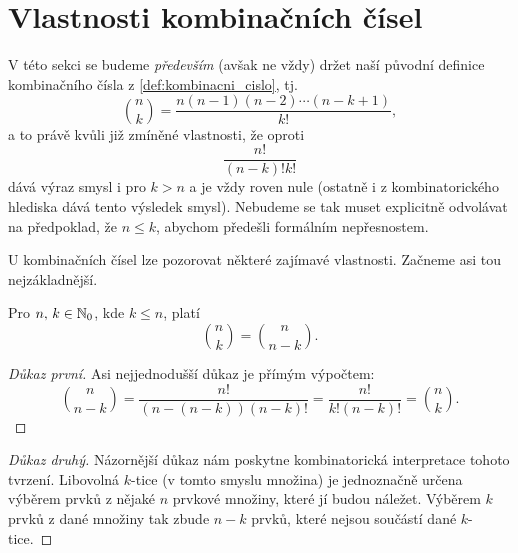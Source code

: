 \section{Vlastnosti kombinačních čísel}

V této sekci se budeme \emph{především} (avšak ne vždy) držet naší původní definice kombinačního čísla z \ref{def:kombinacni_cislo}, tj.
\[\binom{n}{k}=\dfrac{n(n-1)(n-2)\cdots(n-k+1)}{k!},\]
a to právě kvůli již zmíněné vlastnosti, že oproti
\[\dfrac{n!}{(n-k)!k!}\]
dává výraz smysl i pro $k>n$ a je vždy roven nule (ostatně i z kombinatorického hlediska dává tento výsledek smysl). Nebudeme se tak muset explicitně odvolávat na předpoklad, že $n\leqslant k$, abychom předešli formálním nepřesnostem.
\medskip

U kombinačních čísel lze pozorovat některé zajímavé vlastnosti. Začneme asi tou nejzákladnější.
\begin{theorem}
    Pro $n,\,k\in\mathbb{N}_0$, kde $k\leqslant n$, platí
    \[\binom{n}{k}=\binom{n}{n-k}.\]
\end{theorem}
\begin{proof}[Důkaz první]
    Asi nejjednodušší důkaz je přímým výpočtem:
    \[\binom{n}{n-k}=\dfrac{n!}{(n-(n-k))(n-k)!}=\dfrac{n!}{k!(n-k)!}=\binom{n}{k}.\]
\end{proof}
\begin{proof}[Důkaz druhý]
    Názornější důkaz nám poskytne kombinatorická interpretace tohoto tvrzení. Libovolná $k$-tice (v tomto smyslu množina) je jednoznačně určena výběrem prvků z nějaké $n$ prvkové množiny, které jí budou náležet. Výběrem $k$ prvků z dané množiny tak zbude $n-k$ prvků, které nejsou součástí dané $k$-tice.
\end{proof}